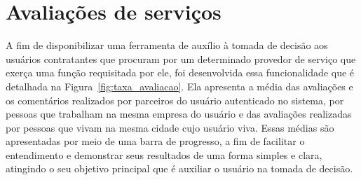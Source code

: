 \section{Avaliações de serviços}

A fim de disponibilizar uma ferramenta de auxílio à tomada de decisão aos usuários contratantes que procuram por um determinado provedor de serviço que exerça uma função requisitada por ele, foi desenvolvida essa funcionalidade que é detalhada na Figura~\ref{fig:taxa_avaliacao}. Ela apresenta a média das avaliações e os comentários realizados por parceiros do usuário autenticado no sistema, por pessoas que trabalham na mesma empresa do usuário e das avaliações realizadas por pessoas que vivam na mesma cidade cujo usuário viva. Essas médias são apresentadas por meio de uma barra de progresso, a fim de facilitar o entendimento e demonstrar seus resultados de uma forma simples e clara, atingindo o seu objetivo principal que é auxiliar o usuário na tomada de decisão.